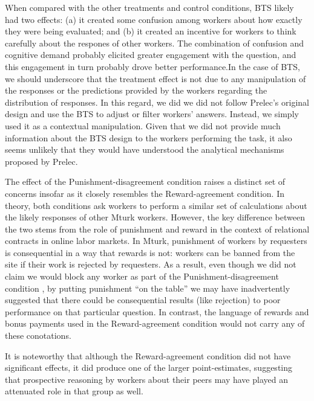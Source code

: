 \documentclass{chi2009}
\begin{document}
{When compared with the other treatments and control conditions, BTS
likely had two effects: (a) it created some confusion among workers
about how exactly they were being evaluated; and (b) it created an
incentive for workers to think carefully about the respones of other
workers. The combination of confusion and cognitive demand probably
elicited greater engagement with the question, and this engagement in
turn probably drove better performance.In the case of BTS, we should
underscore that the treatment effect is not due to any manipulation of
the responses or the predictions provided by the workers regarding the
distribution of responses. In this regard, we did we did not follow
Prelec's original design and use the BTS to adjust or filter workers'
answers.\cite{prelec_bts_2004} Instead, we simply used it as a
contextual manipulation. Given that we did not provide much
information about the BTS design to the workers performing the task,
it also seems unlikely that they would have understood the analytical
mechanisms proposed by Prelec.

The effect of the Punishment-disagreement condition raises a distinct
set of concerns insofar as it closely resembles the Reward-agreement
condition. In theory, both conditions ask workers to perform a similar
set of calculations about the likely responses of other Mturk
workers. However, the key difference between the two stems from the
role of punishment and reward in the context of relational contracts in
online labor markets. In Mturk, punishment of workers by requesters is
consequential in a way that rewards is not: workers can be banned from
the site if their work is rejected by requesters. As a result, even
though we did not claim we would block any worker as part of the
Punishment-disagreement condition , by putting punishment ``on the
table''  we may have inadvertently suggested that there could be
consequential results (like rejection) to poor performance on that particular
question. In contrast, the language of rewards and bonus payments used
in the Reward-agreement condition would not carry any of these
conotations.
 
It is noteworthy that although the Reward-agreement condition did not
have significant effects, it did produce one of the larger
point-estimates, suggesting that prospective reasoning by
workers about their peers may have played an attenuated role in that
group as well.

}
\end{document}
